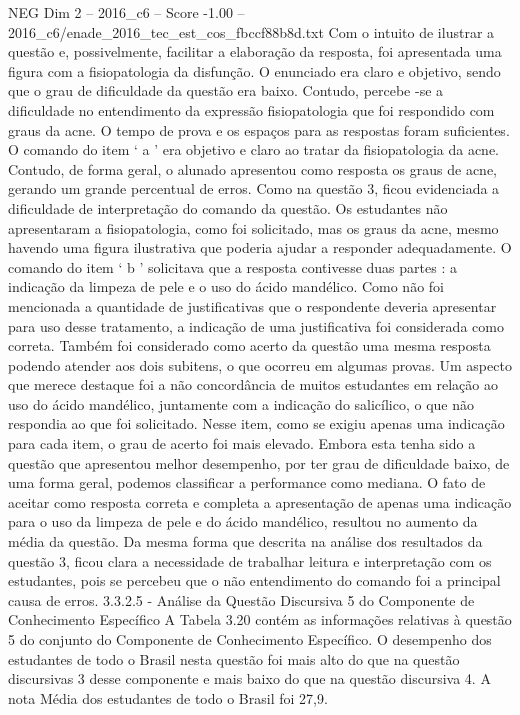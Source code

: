 \begin{textsample}{NEG Dim 2 – 2016\_c6 – Score -1.00 – 2016\_c6/enade\_2016\_tec\_est\_cos\_fbccf88b8d.txt}
Com o intuito de ilustrar a questão e, possivelmente, facilitar a elaboração da resposta, foi apresentada uma figura com a fisiopatologia da disfunção.
O enunciado era claro e objetivo, sendo que o grau de dificuldade da questão era baixo.
Contudo, percebe -se a dificuldade no entendimento da expressão fisiopatologia que foi respondido com graus da acne.
O tempo de prova e os espaços para as respostas foram suficientes.
O comando do item ‘ a ’ era objetivo e claro ao tratar da fisiopatologia da acne.
Contudo, de forma geral, o alunado apresentou como resposta os graus de acne, gerando um grande percentual de erros.
Como na questão 3, ficou evidenciada a dificuldade de interpretação do comando da questão.
Os estudantes não apresentaram a fisiopatologia, como foi solicitado, mas os graus da acne, mesmo havendo uma figura ilustrativa que poderia ajudar a responder adequadamente.
O comando do item ‘ b ’ solicitava que a resposta contivesse duas partes : a indicação da limpeza de pele e o uso do ácido mandélico.
Como não foi mencionada a quantidade de justificativas que o respondente deveria apresentar para uso desse tratamento, a indicação de uma justificativa foi considerada como correta.
Também foi considerado como acerto da questão uma mesma resposta podendo atender aos dois subitens, o que ocorreu em algumas provas.
Um aspecto que merece destaque foi a não concordância de muitos estudantes em relação ao uso do ácido mandélico, juntamente com a indicação do salicílico, o que não respondia ao que foi solicitado.
Nesse item, como se exigiu apenas uma indicação para cada item, o grau de acerto foi mais elevado.
Embora esta tenha sido a questão que apresentou melhor desempenho, por ter grau de dificuldade baixo, de uma forma geral, podemos classificar a performance como mediana.
O fato de aceitar como resposta correta e completa a apresentação de apenas uma indicação para o uso da limpeza de pele e do ácido mandélico, resultou no aumento da média da questão.
Da mesma forma que descrita na análise dos resultados da questão 3, ficou clara a necessidade de trabalhar leitura e interpretação com os estudantes, pois se percebeu que o não entendimento do comando foi a principal causa de erros. 3.3.2.5 - Análise da Questão Discursiva 5 do Componente de Conhecimento Específico A Tabela 3.20 contém as informações relativas à questão 5 do conjunto do Componente de Conhecimento Específico.
O desempenho dos estudantes de todo o Brasil nesta questão foi mais alto do que na questão discursivas 3 desse componente e mais baixo do que na questão discursiva 4.
A nota Média dos estudantes de todo o Brasil foi 27,9.

\end{textsample}
